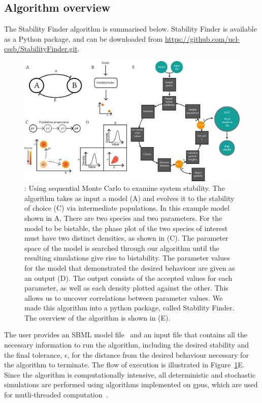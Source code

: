 \subsection{Algorithm overview}
\label{sec:Alg_overview}
The Stability Finder algorithm is summarised below. Stability Finder is available as a Python package, and can be downloaded from \url{https://github.com/ucl-cssb/StabilityFinder.git}. 

\begin{figure}[h]
\begin{center}
\includegraphics[scale=0.9]{../../chapters/chapterStabilityFinder/images/SF_algo_overv.png}
\caption[StabilityFinder algorithm overview]{\label{fig:fig1}: Using sequential Monte Carlo to examine system stability. The algorithm takes as input a model (A) and evolves it to the stability of choice (C) via intermediate populations. In this example model shown in A, There are two species and two parameters. For the model to be bistable, the phase plot of the two species of interest must have two distinct densities, as shown in (C). The parameter space of the model is searched through our algorithm until the resulting simulations give rise to bistability. The parameter values for the model that demonstrated the desired behaviour are given as an output (D). The output consists of the accepted values for each parameter, as well as each density plotted against the other. This allows us to uncover correlations between parameter values. We made this algorithm into a python package, called Stability Finder. The overview of the algorithm is shown in (E).}
\end{center}
\end{figure}
\clearpage

The user provides an SBML model file~\autocite{Finney:2003vk, Hucka:2004wh} and an input file that contains all the necessary information to run the algorithm, including the desired stability and the final tolerance, $\epsilon$, for the distance from the desired behaviour necessary for the algorithm to terminate. The flow of execution is illustrated in Figure~\ref{fig:fig1}E. Since the algorithm is computationally intensive, all deterministic and stochastic simulations are performed using algorithms implemented on \acrfull{gpu}s, which are used for mutli-threaded computation~\autocite{Kirk:2010we}.


